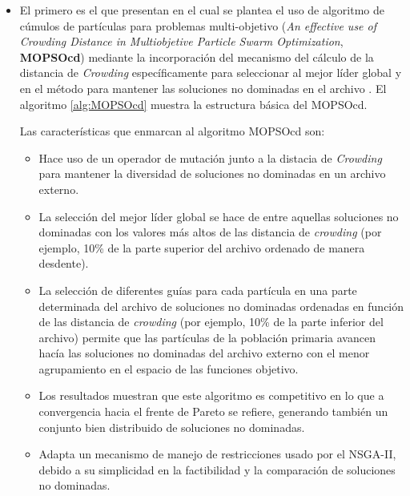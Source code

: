   \begin{itemize}
   \item El primero \DIFdelbegin \DIFdel{, }\DIFdelend \DIFaddbegin {}\DIFaddend es el que presentan \cite{Raquel2005}\DIFaddbegin \DIFadd{, }\DIFaddend en el cual se 
  plantea el uso de \DIFdelbegin {}\DIFdelend algoritmo de c\'umulos de part\'iculas para problemas multi-objetivo (\textit{An effective use of Crowding Distance 
  in Multiobjetive Particle Swarm Optimization}, \textbf{MOPSOcd}) mediante la incorporaci\'on del mecanismo del c\'alculo de la distancia 
  de \textit{Crowding} espec\'ificamente para seleccionar al mejor l\'ider global y en el m\'etodo para mantener las soluciones no dominadas 
  en el archivo \DIFdelbegin {}\DIFdelend \DIFaddbegin {}\DIFaddend . El algoritmo \ref{alg:MOPSOcd} muestra la estructura b\'asica del MOPSOcd.

  Las caracter\'isticas que enmarcan al algoritmo MOPSOcd son:

  \begin{itemize}
   \item Hace uso de un operador de mutaci\'on junto a la distacia de \textit{Crowding} para mantener la 
  diversidad de soluciones no dominadas en un archivo externo.  
  \item La selecci\'on del mejor l\'ider global se hace de entre aquellas soluciones 
  no dominadas con los valores m\'as altos de las distancia de \textit{crowding} (por ejemplo, 10\% de  la parte superior 
  del archivo ordenado de manera desdente). 
  \item La selecci\'on de diferentes gu\'ias para cada part\'icula en una parte determinada del archivo 
  de soluciones no dominadas ordenadas en funci\'on de las distancia de \textit{crowding} 
  (por ejemplo, 10\% de  la parte inferior del archivo)
  permite que las part\'iculas de la poblaci\'on primaria avancen hac\'ia las soluciones no dominadas del archivo externo con el menor 
  agrupamiento en el espacio de las funciones objetivo. 
  \item Los resultados muestran que este algoritmo es competitivo en lo que a 
  convergencia hacia el frente de Pareto se refiere, generando tambi\'en un conjunto bien distribuido de soluciones no dominadas. 
  \item Adapta un mecanismo de manejo de restricciones usado por el NSGA-II, debido a su simplicidad en la factibilidad y la comparaci\'on 
  de soluciones no dominadas.
  \end{itemize}  


\end{itemize}
